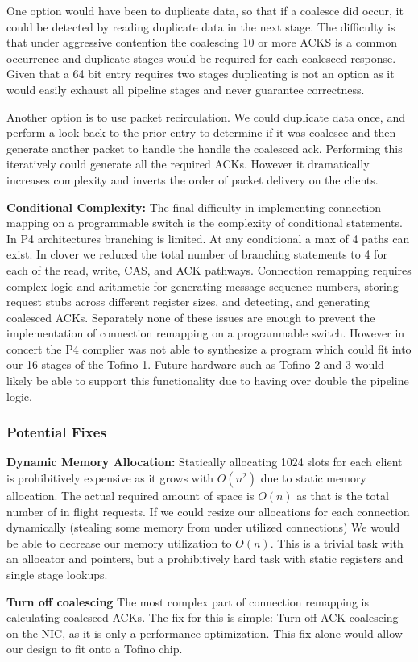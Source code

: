 One option would have been to duplicate data, so that if a coalesce did occur,
it could be detected by reading duplicate data in the next stage.  The
difficulty is that under aggressive contention the coalescing 10 or more ACKS is
a common occurrence and duplicate stages would be required for each coalesced
response. Given that a 64 bit entry requires two stages duplicating is not an
option as it would easily exhaust all pipeline stages and never guarantee
correctness.


Another option is to use packet recirculation. We could duplicate data once, and
perform a look back to the prior entry to determine if it was coalesce and then
generate another packet to handle the handle the coalesced ack. 
Performing this iteratively could generate all the required ACKs. However it
dramatically increases complexity and inverts the order of packet delivery on
the clients.

\textbf{Conditional Complexity:} The final difficulty in implementing connection
mapping on a programmable switch is the complexity of conditional statements. In
P4 architectures branching is limited. At any conditional a max of 4 paths can
exist.  In clover we reduced the total number of branching statements to 4 for
each of the read, write, CAS, and ACK pathways. Connection remapping requires
complex logic and arithmetic for generating message sequence numbers, storing
request stubs across different register sizes, and detecting, and generating
coalesced ACKs.  Separately none of these issues are enough to prevent the
implementation of connection remapping on a programmable switch. However in
concert the P4 complier was not able to synthesize a program which could fit
into our 16 stages of the Tofino 1. Future hardware such as Tofino 2 and 3 would
likely be able to support this functionality due to having over double the
pipeline logic.

\subsubsection{Potential Fixes}

\textbf{Dynamic Memory Allocation:}
Statically allocating 1024 slots for each client is prohibitively expensive as
it grows with $O(n^2)$ due to static memory allocation. The actual required
amount of space is $O(n)$ as that is the total number of in flight requests. If
we could resize our allocations for each connection dynamically (stealing some
memory from under utilized connections) We would be able to decrease our memory
utilization to $O(n)$. This is a trivial task with an allocator and pointers, but
a prohibitively hard task with static registers and single stage lookups.

\textbf{Turn off coalescing} The most complex part of connection remapping is
calculating coalesced ACKs. The fix for this is simple: Turn off ACK coalescing
on the NIC, as it is only a performance optimization. This fix alone would allow
our design to fit onto a Tofino chip.








